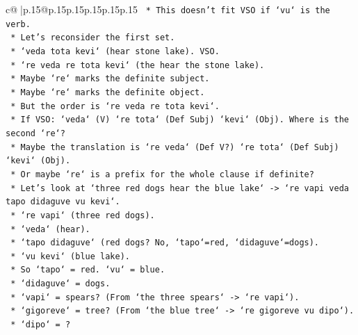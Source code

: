 \documentclass{article}
\begin{document}
{\begin{supertabular}{c@{$\;$}|p{.15\linewidth}@{}p{.15\linewidth}p{.15\linewidth}p{.15\linewidth}p{.15\linewidth}p{.15\linewidth}}
{{{\texttt{                            *   This doesn't fit VSO if `vu` is the verb.} \\
\texttt{                            *   Let's reconsider the first set.} \\
\texttt{                            *   `veda tota kevi` (hear stone lake). VSO.} \\
\texttt{                            *   `re veda re tota kevi` (the hear the stone lake).} \\
\texttt{                                *   Maybe `re` marks the definite subject.} \\
\texttt{                                *   Maybe `re` marks the definite object.} \\
\texttt{                                *   But the order is `re veda re tota kevi`.} \\
\texttt{                                *   If VSO: `veda` (V) `re tota` (Def Subj) `kevi` (Obj). Where is the second `re`?} \\
\texttt{                                *   Maybe the translation is `re veda` (Def V?) `re tota` (Def Subj) `kevi` (Obj).} \\
\texttt{                                *   Or maybe `re` is a prefix for the whole clause if definite?} \\
\texttt{                                *   Let's look at `three red dogs hear the blue lake` {-}> `re vapi veda tapo didaguve vu kevi`.} \\
\texttt{                                    *   `re vapi` (three red dogs).} \\
\texttt{                                    *   `veda` (hear).} \\
\texttt{                                    *   `tapo didaguve` (red dogs? No, `tapo`=red, `didaguve`=dogs).} \\
\texttt{                                    *   `vu kevi` (blue lake).} \\
\texttt{                                    *   So `tapo` = red. `vu` = blue.} \\
\texttt{                                    *   `didaguve` = dogs.} \\
\texttt{                                    *   `vapi` = spears? (From `the three spears` {-}> `re vapi`).} \\
\texttt{                                    *   `gigoreve` = tree? (From `the blue tree` {-}> `re gigoreve vu dipo`).} \\
\texttt{                                    *   `dipo` = ?} \\
}}}
\end{supertabular}}
\end{document}
